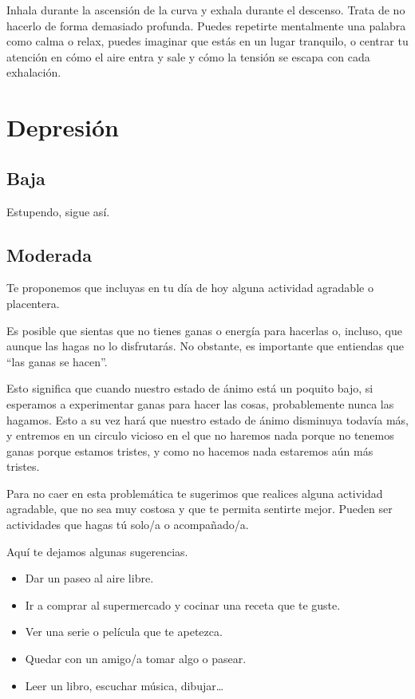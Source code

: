             Inhala durante la ascensión de la curva y exhala durante el descenso. Trata de no hacerlo de forma demasiado profunda. Puedes repetirte mentalmente una palabra como calma o relax, puedes imaginar que estás en un lugar tranquilo, o centrar tu atención en cómo el aire entra y sale y cómo la tensión se escapa con cada exhalación. 
    
    \section{Depresión}
        \label{chapter:recomendaciones:depresion}
        \subsection{Baja}
            Estupendo, sigue así. 
        \subsection{Moderada}

            Te proponemos que incluyas en tu  día de hoy alguna actividad agradable o placentera. 
            
            Es posible que sientas que no tienes ganas o energía para hacerlas o, incluso, que aunque las hagas no lo disfrutarás. No obstante, es importante que entiendas que “las ganas se hacen”. 
            
            Esto significa que cuando nuestro estado de ánimo está un poquito bajo, si esperamos a experimentar ganas para hacer las cosas, probablemente nunca las hagamos. Esto a su vez hará que nuestro estado de ánimo disminuya todavía más, y entremos en un circulo vicioso en el que no haremos nada porque no tenemos ganas porque estamos tristes, y como no hacemos nada estaremos aún más tristes. 
            
            Para no caer en esta problemática te sugerimos que realices alguna actividad agradable, que no sea muy costosa y que te permita sentirte mejor. Pueden ser actividades que hagas tú solo/a o acompañado/a. 
            
            Aquí te dejamos algunas sugerencias. 
            \begin{itemize}
                \item Dar un paseo al aire libre. 
                \item Ir a comprar al supermercado y cocinar una receta que te guste. 
                \item Ver una serie o película que te apetezca.
                \item Quedar con un amigo/a tomar algo o pasear.
                \item Leer un libro, escuchar música, dibujar… 
            \end{itemize}

